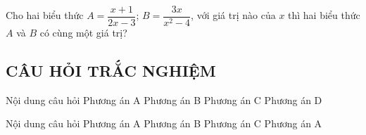 \begin{bt}%
	Cho hai biểu thức $A =\dfrac{x + 1}{2 x - 3}$; $B =\dfrac{3 x}{x^2- 4}$, với giá trị nào của $x$ thì hai biểu thức $A$ và $B$ có cùng một giá trị?
\end{bt}
\subsection{CÂU HỎI TRẮC NGHIỆM}
\begin{ex}
	Nội dung câu hỏi
	\choice
	{Phương án A}
	{Phương án B}
	{Phương án C}
	{\True Phương án D}
\end{ex}
\begin{ex}
	Nội dung câu hỏi
	\choice
	{Phương án A}
	{Phương án B}
	{Phương án C}
	{\True Phương án A}
\end{ex}

